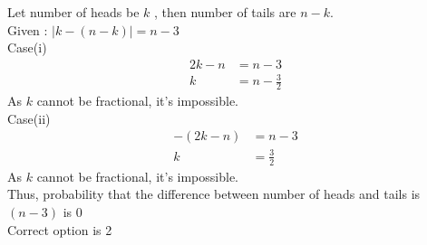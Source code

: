 
Let number of heads be $k$ , then number of tails are $n-k$.\\
Given : $|k-(n-k)|= n-3$\\
Case(i) \begin{align*}
    2k-n &= n-3 \\
    k &= n- \frac{3}{2}
\end{align*}
As $k$ cannot be fractional, it's impossible.\\
Case(ii) \begin{align*}
    -(2k-n) &= n-3 \\
    k &= \frac{3}{2}
\end{align*}
As $k$ cannot be fractional, it's impossible.\\
Thus, probability that the difference between number of heads and tails is $(n-3)$ is 0\\
Correct option is 2
